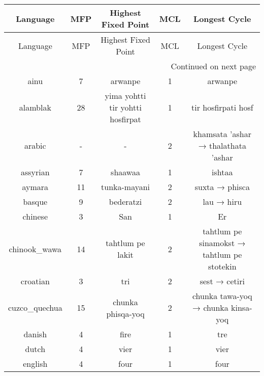 \begin{landscape}
\begin{longtable}{|c|c|c|c|c|}
\toprule
     Language & MFP &              Highest Fixed Point & MCL &                                     Longest Cycle \\
\midrule
\endfirsthead

\toprule
     Language & MFP &              Highest Fixed Point & MCL &                                     Longest Cycle \\
\midrule
\endhead
\midrule
\multicolumn{5}{r}{{Continued on next page}} \\
\midrule
\endfoot

\bottomrule
\endlastfoot
         ainu &   7 &                          arwanpe &   1 &                                           arwanpe \\
     alamblak &  28 & yima yohtti tir yohtti hosfirpat &   1 &                               tir hosfirpati hosf \\
       arabic &   - &                                - &   2 &               khamsata 'ashar → thalathata 'ashar \\
     assyrian &   7 &                          shaawaa &   1 &                                            ishtaa \\
       aymara &  11 &                     tunka-mayani &   2 &                                    suxta → phisca \\
       basque &   9 &                        bederatzi &   2 &                                        lau → hiru \\
      chinese &   3 &                             San  &   1 &                                               Er  \\
 chinook\_wawa &  14 &                 tahtlum pe lakit &   2 &        tahtlum pe sinamokst → tahtlum pe stotekin \\
     croatian &   3 &                              tri &   2 &                                     sest → cetiri \\
cuzco\_quechua &  15 &                chunka phisqa-yoq &   2 &                chunka tawa-yoq → chunka kinsa-yoq \\
       danish &   4 &                             fire &   1 &                                               tre \\
        dutch &   4 &                             vier &   1 &                                              vier \\
      english &   4 &                             four &   1 &                                              four \\

\end{longtable}
\end{landscape}

